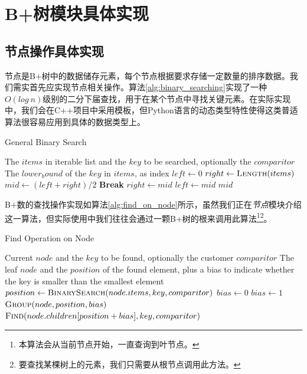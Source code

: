 \documentclass[UTF8]{ctexrep} %
\begin{document}
\section{B+树模块具体实现}
\subsection{节点操作具体实现}
节点是B+树中的数据储存元素，每个节点根据要求存储一定数量的排序数据。我们需实首先应实现节点相关操作。算法\ref{alg:binary_searching}实现了一种$O(log\ n)$级别的二分下届查找，用于在某个节点中寻找关键元素。在实际实现中，我们会在C++项目中采用模板，但Python语言的动态类型特性使得这类普适算法很容易应用到具体的数据类型上。
\begin{algorithm}[H]
    \caption{General Binary Search}
    \label{alg:binary_searching}
    \begin{algorithmic}[1]
        \Require The $items$ in iterable list and the $key$ to be searched, optionally the $comparitor$
        \Ensure The $lower_bound$ of the $key$ in $items$, as index
            \State $left \leftarrow 0$
            \State $right \leftarrow \Call{Length}{items}$
                \State $mid \leftarrow (left + right) / 2$
                    \State \textbf{Break}
                \EndIf
                 
                    \State $right \leftarrow mid$
                \Else
                    \State $left \leftarrow mid$
                \EndIf
            \EndWhile
            \State \Return $mid$
        \EndFunction
    \end{algorithmic}
\end{algorithm}

B+数的查找操作实现如算法\ref{alg:find_on_node}所示，虽然我们正在\textit{节点}模块介绍这一算法，但实际使用中我们往往会通过一颗B+树的根来调用此算法\footnote{本算法会从当前节点开始，一直查询到叶节点。}\footnote{要查找某棵树上的元素，我们只需要从根节点调用此方法。}。

\begin{algorithm}[H]
    \caption{Find Operation on Node}
    \label{alg:find_on_node}
    \begin{algorithmic}[1]
        \Require Current $node$ and the $key$ to be found, optionally the customer $comparitor$
        \Ensure The leaf $node$ and the $position$ of the found element, plus a bias to indicate whether the key is smaller than the smallest element
            \State $position \leftarrow \Call{BinarySearch}{node.items, key, comparitor}$
                \State $bias \leftarrow 0$
            \Else
                \State $bias \leftarrow 1$
            \EndIf
                \State \Return $\Call{Group}{node, position, bias}$
            \Else
                \State \Return $\Call{Find}{node.children[position + bias], key, comparitor}$
            \EndIf
        \EndFunction
    \end{algorithmic}
\end{algorithm}
\end{document}
